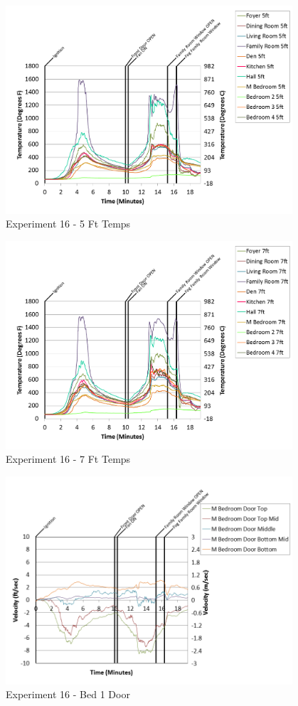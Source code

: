 \documentclass{article}
\begin{document}
\begin{appendices}
\begin{figure}[h!]
	\centering
	\includegraphics[height=3.05in]{0_Images/Results_Charts/Exp_16_Charts/5FtTemps.png}
	\caption{Experiment 16 - 5 Ft Temps}
\end{figure}


\begin{figure}[h!]
	\centering
	\includegraphics[height=3.05in]{0_Images/Results_Charts/Exp_16_Charts/7FtTemps.png}
	\caption{Experiment 16 - 7 Ft Temps}
\end{figure}

\clearpage

\begin{figure}[h!]
	\centering
	\includegraphics[height=3.05in]{0_Images/Results_Charts/Exp_16_Charts/Bed1Door.png}
	\caption{Experiment 16 - Bed 1 Door}
\end{figure}



\end{appendices}
\end{document}
